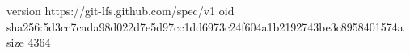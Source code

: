 version https://git-lfs.github.com/spec/v1
oid sha256:5d3cc7cada98d022d7e5d97cc1dd6973c24f604a1b2192743be3c8958401574a
size 4364
